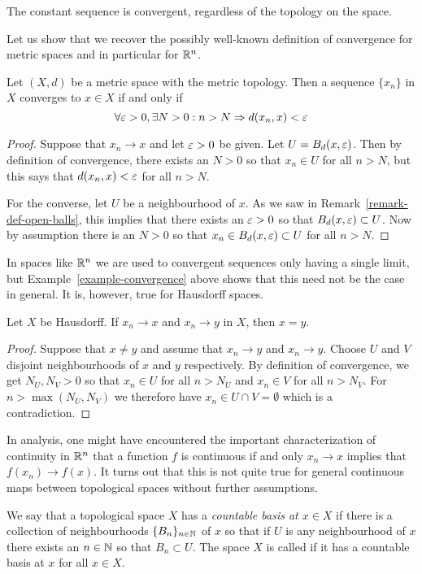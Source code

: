 \begin{example}
  The constant sequence is convergent, regardless of the topology on the space.
\end{example}
Let us show that we recover the possibly well-known definition of convergence for metric spaces and in particular for $\mathbb{R}^n$.
\begin{prop}
  \label{metric-convergence}
  Let $(X,d)$ be a metric space with the metric topology. Then a sequence $\{x_n\}$ in $X$ converges to $x \in X$ if and only if
  \[
    \forall \varepsilon > 0, \exists N > 0 : n > N \Rightarrow d(x_n,x) < \varepsilon
  \] 
\end{prop}
\begin{proof}
  Suppose that $x_n \to x$ and let $\varepsilon > 0$ be given. Let $U = B_d(x,\varepsilon)$. Then by definition of convergence, there exists an $N > 0$ so that $x_n \in U$ for all $n > N$, but this says that $d(x_n,x) < \varepsilon$ for all $n > N$.
  
  For the converse, let $U$ be a neighbourhood of $x$. As we saw in Remark~\ref{remark-def-open-balls}, this implies that there exists an $\varepsilon > 0$ so that $B_d(x,\varepsilon) \subset U$. Now by assumption there is an $N > 0$ so that $x_n \in B_d(x,\varepsilon) \subset U$ for all $n > N$.
\end{proof}
In spaces like $\mathbb{R}^n$ we are used to convergent sequences only having a single limit, but Example~\ref{example-convergence} above shows that this need not be the case in general. It is, however, true for Hausdorff spaces.
\begin{prop}
  Let $X$ be Hausdorff. If $x_n \to x$ and $x_n \to y$ in $X$, then $x = y$.
\end{prop}
\begin{proof}
  Suppose that $x \not= y$ and assume that $x_n \to y$ and $x_n \to y$. Choose $U$ and $V$ disjoint neighbourhoods of $x$ and $y$ respectively. By definition of convergence, we get $N_U, N_V > 0$ so that $x_n \in U$ for all $n > N_U$ and $x_n \in V$ for all $n > N_V$. For $n > \max(N_U,N_V)$ we therefore have $x_n \in U \cap V = \emptyset$ which is a contradiction.
\end{proof}
In analysis, one might have encountered the important characterization of continuity in $\mathbb{R}^n$ that a function $f$ is continuous if and only $x_n \to x$ implies that $f(x_n) \to f(x)$. It turns out that this is not quite true for general continuous maps between topological spaces without further assumptions.
\begin{defn}
  We say that a topological space $X$ has a \emph{countable basis at $x\in X$} if there is a collection of neighbourhoods $\{B_n\}_{n\in \mathbb{N}}$ of $x$ so that if $U$ is any neighbourhood of $x$ there exists an $n \in \mathbb{N}$ so that $B_n \subset U$. The space $X$ is called  if it has a countable basis at $x$ for all $x \in X$.
\end{defn}
